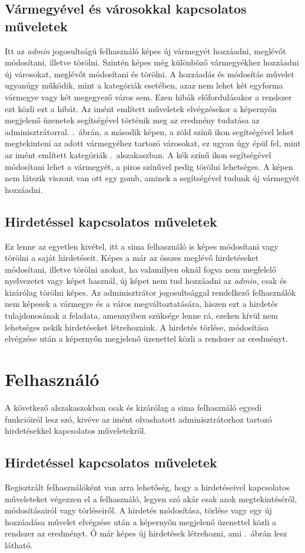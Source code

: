 \documentclass[]{thesis-ekf}
\theoremstyle{definition}
\theoremstyle{remark}
\begin{document}
	\subsection{Vármegyével és városokkal kapcsolatos műveletek}
		Itt az \emph{admin} jogosultságú felhasználó képes új vármegyét hozzáadni, meglévőt módosítani, illetve törölni. Szintén képes még különböző vármegyékhez hozzáadni új városokat, meglévőt módosítani és törölni. A hozzáadás és módosítás művelet ugyanúgy működik, mint a kategóriák esetében, azaz nem lehet két egyforma vármegye vagy két megegyező város sem. Ezen hibák előfordulásakor a rendszer ezt közli ezt a hibát. Az imént említett műveletek elvégzésekor a képernyőn megjelenő üzenetek segítségével történik meg az eredmény tudatása az adminisztrátorral. .~ábrán, a második képen, a zöld színű ikon segítségével lehet megtekinteni az adott vármegyéhez tartozó városokat, ez ugyan úgy épül fel, mint az imént említett kategóriák .~alszakaszban. A kék színű ikon segítségével módosítani lehet a vármegyét, a piros színűvel pedig törölni lehetséges. A képen nem látszik viszont van ott egy gomb, aminek a segítségével tudunk új vármegyét hozzáadni.
	\subsection{Hirdetéssel kapcsolatos műveletek}
		Ez lenne az egyetlen kivétel, itt a sima felhasználó is képes módosítani vagy törölni a saját hirdetéseit. Képes a már az összes meglévő hirdetéseket módosítani, illetve törölni azokat, ha valamilyen oknál fogva nem megfelelő nyelvezetet vagy képet használ, új képet nem tud hozzáadni az \emph{admin}, csak és kizárólag törölni képes. Az adminisztrátor jogosultsággal rendelkező felhasználók nem képesek a vármegye és a város megváltoztatására, hiszen ezt a hirdetés tulajdonosának a feladata, amennyiben szüksége lenne rá, ezeken kívül nem lehetséges nekik hirdetéseket létrehozniuk. A hirdetés törlése, módosítása elvégzése után a képernyőn megjelenő üzenettel közli a rendszer az eredményt.
	\section{Felhasználó}
		A következő alszakaszokban csak és kizárólag a sima felhasználó egyedi funkcióiról lesz szó, kivéve az imént olvashatott adminisztrátorhoz tartozó hirdetésekkel kapcsolatos műveletekről.
	\subsection{Hirdetéssel kapcsolatos műveletek}
		Regisztrált felhasználóként van arra lehetőség, hogy a hirdetéseivel kapcsolatos műveleteket végezzen el a felhasználó, legyen szó akár csak azok megtekintéséről, módosításairól vagy törléseiről. A hirdetés módosítása, törlése vagy egy új hozzáadása művelet elvégzése után a képernyőn megjelenő üzenettel közli a rendszer az eredményt. Ő már képes új hirdetések létrehozni, ami .~ábrán lesz látható.
		
\end{document}
